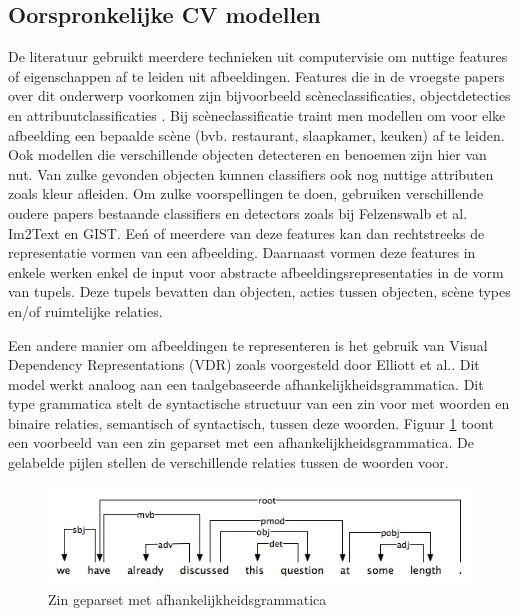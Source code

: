 \subsection{Oorspronkelijke CV modellen}
De literatuur gebruikt meerdere technieken uit computervisie om nuttige features of eigenschappen af te leiden uit afbeeldingen. Features die in de vroegste papers over dit onderwerp voorkomen zijn bijvoorbeeld sc\`eneclassificaties, objectdetecties en attribuutclassificaties \cite{Farhadi2010,Patterson2014,Yang2011}. Bij sc\`eneclassificatie traint men modellen om voor elke afbeelding een bepaalde sc\`ene (bvb. restaurant, slaapkamer, keuken) af te leiden. Ook modellen die verschillende objecten detecteren en benoemen zijn hier van nut. Van zulke gevonden objecten kunnen classifiers ook nog nuttige attributen zoals kleur afleiden. Om zulke voorspellingen te doen, gebruiken verschillende oudere papers bestaande classifiers en detectors zoals bij Felzenswalb et al.\cite{Felzenszwalb2008} Im2Text\cite{Ordonez2011} en GIST\cite{Oliva2006}. Ee\'n of meerdere van deze features kan dan rechtstreeks de representatie vormen van een afbeelding. Daarnaast vormen deze features in enkele werken \cite{Farhadi2010,Li2011,Mitchell2012,Yang2011} enkel de input voor abstracte afbeeldingsrepresentaties in de vorm van tupels. Deze tupels bevatten dan objecten, acties tussen objecten, sc\`ene types en/of ruimtelijke relaties.

Een andere manier om afbeeldingen te representeren is het gebruik van Visual Dependency Representations (VDR) zoals voorgesteld door Elliott et al.\cite{Elliott2013}. Dit model werkt analoog aan een taalgebaseerde afhankelijkheidsgrammatica. Dit type grammatica stelt de syntactische structuur van een zin voor met woorden en binaire relaties, semantisch of syntactisch, tussen deze woorden\cite{Jurafsky:2009:SLP:1214993}. Figuur \ref{fig:dep_grammar} toont een voorbeeld van een zin geparset met een afhankelijkheidsgrammatica. De gelabelde pijlen stellen de verschillende relaties tussen de woorden voor. 

\begin{figure}[tb]
      \centering
      \includegraphics[width=\linewidth]{Images/dependencygrammar.jpg}
      \caption{Zin geparset met afhankelijkheidsgrammatica\cite{GasserNotes}}
      \label{fig:dep_grammar}
  \end{figure}  

